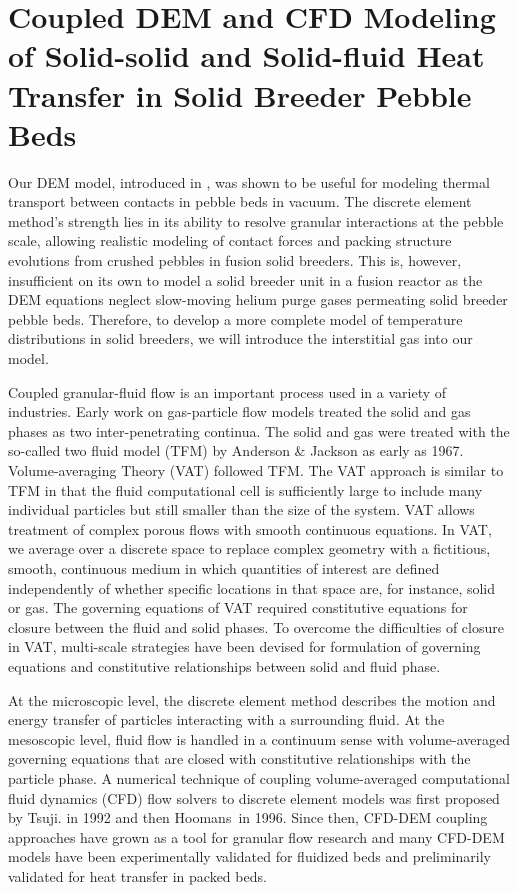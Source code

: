 \chapter{Coupled DEM and CFD Modeling of Solid-solid and Solid-fluid Heat Transfer in Solid Breeder Pebble Beds}\label{ch:cfd-dem-modeling-development}
Our DEM model, introduced in , was shown to be useful for modeling thermal transport between contacts in pebble beds in vacuum. The discrete element method's strength lies in its ability to resolve granular interactions at the pebble scale, allowing realistic modeling of contact forces and packing structure evolutions from crushed pebbles in fusion solid breeders. This is, however, insufficient on its own to model a solid breeder unit in a fusion reactor as the DEM equations neglect slow-moving helium purge gases permeating solid breeder pebble beds. Therefore, to develop a more complete model of temperature distributions in solid breeders, we will introduce the interstitial gas into our model.

Coupled granular-fluid flow is an important process used in a variety of industries.\cite{Zhou2010,Kloss2012} Early work on gas-particle flow models treated the solid and gas phases as two inter-penetrating continua. The solid and gas were treated with the so-called two fluid model (TFM) by Anderson \& Jackson as early as 1967.\cite{Anderson1967} Volume-averaging Theory (VAT) followed TFM. The VAT approach is similar to TFM in that the fluid computational cell is sufficiently large to include many individual particles but still smaller than the size of the system.\cite{Enwald1996} VAT allows treatment of complex porous flows with smooth continuous equations. In VAT, we average over a discrete space to replace complex geometry with a fictitious, smooth, continuous medium in which quantities of interest are defined independently of whether specific locations in that space are, for instance, solid or gas.\cite{Sbutega2013,whitaker1999method} The governing equations of VAT required constitutive equations for closure between the fluid and solid phases. To overcome the difficulties of closure in VAT, multi-scale strategies have been devised for formulation of governing equations and constitutive relationships between solid and fluid phase. 

At the microscopic level, the discrete element method describes the motion and energy transfer of particles interacting with a surrounding fluid. At the mesoscopic level, fluid flow is handled in a continuum sense with volume-averaged governing equations that are closed with constitutive relationships with the particle phase.\cite{Tsuji1992,Xu1997} A numerical technique of coupling volume-averaged computational fluid dynamics (CFD) flow solvers to discrete element models was first proposed by Tsuji\etal. in 1992 and then Hoomans\etal~in 1996.\cite{Tsuji1992,Tsuji1993,Hoomans1996} Since then, CFD-DEM coupling approaches have grown as a tool for granular flow research and many CFD-DEM models have been experimentally validated for fluidized beds and preliminarily validated for heat transfer in packed beds.\cite{Kloss2012,Xu1997,Patankar2001,Swasdisevi2005,Deen2007,Zhang2008,Chu2008,VanBuijtenen2011,Gruber2012,Peng2014}


